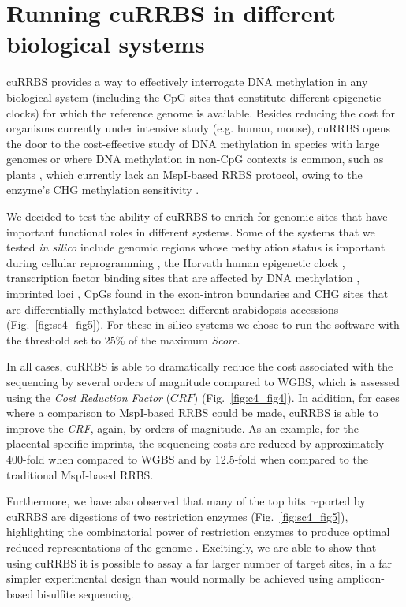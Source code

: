 \section{Running cuRRBS in different biological systems}

\smallskip

cuRRBS provides a way to effectively interrogate DNA methylation in any biological system (including the CpG sites that constitute different epigenetic clocks) for which the reference genome is available. Besides reducing the cost for organisms currently under intensive study (e.g. human, mouse), cuRRBS opens the door to the cost-effective study of DNA methylation in species with large genomes or where DNA methylation in non-CpG contexts is common, such as plants \cite{Stroud2013}, which currently lack an MspI-based RRBS protocol, owing to the enzyme’s CHG methylation sensitivity \cite{Sun2014}.

\bigskip

We decided to test the ability of cuRRBS to enrich for genomic sites that have important functional roles in different systems. Some of the systems that we tested \textit{in silico} include genomic regions whose methylation status is important during cellular reprogramming \cite{Milagre2017}, the Horvath human epigenetic clock \cite{Horvath2013}, transcription factor binding sites that are affected by DNA methylation \cite{Maurano2015,Domcke2015}, imprinted loci \cite{Hanna2016}, CpGs found in the exon-intron boundaries \cite{LevMaor2015} and CHG sites that are differentially methylated between different arabidopsis accessions \cite{Kawakatsu2016} (Fig.~\ref{fig:sc4_fig5}). For these in silico systems we chose to run the software with the threshold set to $25\%$ of the maximum \textit{Score}.

\bigskip

In all cases, cuRRBS is able to dramatically reduce the cost associated with the sequencing by several orders of magnitude compared to WGBS, which is assessed using the \textit{Cost Reduction Factor} ($CRF$) (Fig.~\ref{fig:c4_fig4}). In addition, for cases where a comparison to MspI-based RRBS could be made, cuRRBS is able to improve the \textit{CRF}, again, by orders of magnitude. As an example, for the placental-specific imprints, the sequencing costs are reduced by approximately 400-fold when compared to WGBS and by 12.5-fold when compared to the traditional MspI-based RRBS.

\bigskip

Furthermore, we have also observed that many of the top hits reported by cuRRBS are digestions of two restriction enzymes (Fig.~\ref{fig:sc4_fig5}), highlighting the combinatorial power of restriction enzymes to produce optimal reduced representations of the genome \cite{Bystrykh2013}. Excitingly, we are able to show that using cuRRBS it is possible to assay a far larger number of target sites, in a far simpler experimental design than would normally be achieved using amplicon-based bisulfite sequencing.


